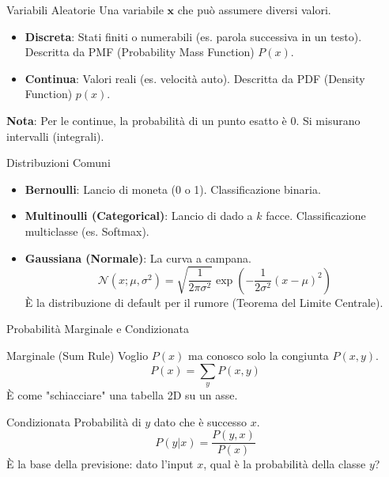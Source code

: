 \documentclass[aspectratio=169, 10pt]{beamer}
\begin{document}
\begin{frame}{Variabili Aleatorie}
    Una variabile $\mathbf{x}$ che può assumere diversi valori.
    \begin{itemize}
        \item \textbf{Discreta}: Stati finiti o numerabili (es. parola successiva in un testo). Descritta da PMF (Probability Mass Function) $P(x)$.
        \item \textbf{Continua}: Valori reali (es. velocità auto). Descritta da PDF (Density Function) $p(x)$.
    \end{itemize}
    \textbf{Nota}: Per le continue, la probabilità di un punto esatto è 0. Si misurano intervalli (integrali).
\end{frame}

\begin{frame}{Distribuzioni Comuni}
    \begin{itemize}
        \item \textbf{Bernoulli}: Lancio di moneta (0 o 1). Classificazione binaria.
        \item \textbf{Multinoulli (Categorical)}: Lancio di dado a $k$ facce. Classificazione multiclasse (es. Softmax).
        \item \textbf{Gaussiana (Normale)}: La curva a campana.
        \[ \mathcal{N}(x; \mu, \sigma^2) = \sqrt{\frac{1}{2\pi\sigma^2}} \exp \left( -\frac{1}{2\sigma^2}(x-\mu)^2 \right) \]
        È la distribuzione di default per il rumore (Teorema del Limite Centrale).
    \end{itemize}
\end{frame}

\begin{frame}{Probabilità Marginale e Condizionata}
    \begin{block}{Marginale (Sum Rule)}
        Voglio $P(x)$ ma conosco solo la congiunta $P(x, y)$.
        \[ P(x) = \sum_{y} P(x, y) \]
        È come "schiacciare" una tabella 2D su un asse.
    \end{block}

    \begin{block}{Condizionata}
        Probabilità di $y$ dato che è successo $x$.
        \[ P(y | x) = \frac{P(y, x)}{P(x)} \]
        È la base della previsione: dato l'input $x$, qual è la probabilità della classe $y$?
    \end{block}
\end{frame}
\end{document}
